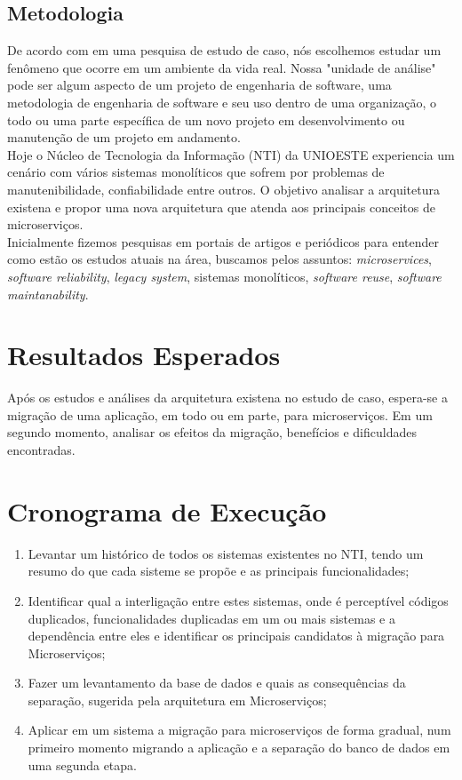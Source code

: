 \documentclass[12pt]{article}
\begin{document}
\subsection{Metodologia}
De acordo com \cite{PERRUNESON2012} em uma pesquisa de estudo de caso, nós escolhemos estudar um fenômeno que ocorre em um ambiente da vida real. Nossa "unidade de análise"\hspace{0.05cm} pode ser algum aspecto de um projeto de engenharia de software, uma metodologia de engenharia de software e seu uso dentro de uma organização, o todo ou uma parte específica de um novo projeto em desenvolvimento ou manutenção de um projeto em andamento.
\\Hoje o Núcleo de Tecnologia da Informação (NTI) da UNIOESTE experiencia um cenário com vários sistemas monolíticos que sofrem por problemas de manutenibilidade, confiabilidade entre outros. O objetivo analisar a arquitetura existena e propor uma nova arquitetura que atenda aos principais conceitos de microserviços.
\\Inicialmente fizemos pesquisas em portais de artigos e periódicos para entender como estão os estudos atuais na área, buscamos pelos assuntos: \textit{microservices}, \textit{software reliability}, \textit{legacy system}, sistemas monolíticos, \textit{software reuse}, \textit{software maintanability}.
 
\section{Resultados Esperados}

Após os estudos e análises da arquitetura existena no estudo de caso, espera-se a migração de uma aplicação, em todo ou em parte, para microserviços. Em um segundo momento, analisar os efeitos da migração, benefícios e dificuldades encontradas.

\section{Cronograma de Execução}

\begin{enumerate}
	\item Levantar um histórico de todos os sistemas existentes no NTI, tendo um resumo do que cada sisteme se propõe e as principais funcionalidades;
	\item Identificar qual a interligação entre estes sistemas, onde é perceptível códigos duplicados, funcionalidades duplicadas em um ou mais sistemas e a dependência entre eles e identificar os principais candidatos à migração para Microserviços;
	\item Fazer um levantamento da base de dados e quais as consequências da separação, sugerida pela arquitetura em Microserviços;
	\item Aplicar em um sistema a migração para microserviços de forma gradual, num primeiro momento migrando a aplicação e a separação do banco de dados em uma segunda etapa.
	
\end{enumerate}





\end{document}
